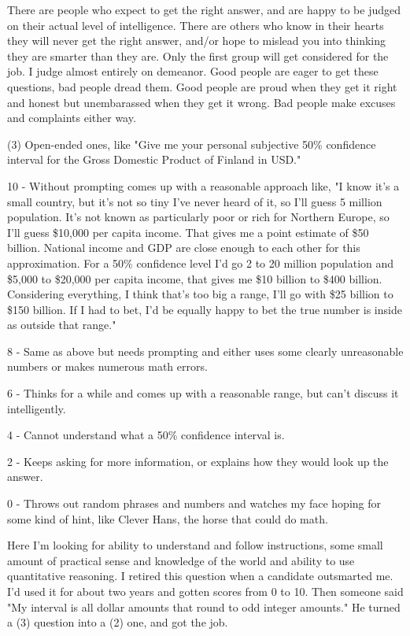 There are people who expect to get the right answer, and are happy to be judged on their actual level of intelligence. There are others who know in their hearts they will never get the right answer, and/or hope to mislead you into thinking they are smarter than they are. Only the first group will get considered for the job. I judge almost entirely on demeanor. Good people are eager to get these questions, bad people dread them. Good people are proud when they get it right and honest but unembarassed when they get it wrong. Bad people make excuses and complaints either way.\par

(3) Open-ended ones, like "Give me your personal subjective 50\% confidence interval for the Gross Domestic Product of Finland in USD."\par

10 - Without prompting comes up with a reasonable approach like, "I know it's a small country, but it's not so tiny I've never heard of it, so I'll guess 5 million population. It's not known as particularly poor or rich for Northern Europe, so I'll guess \$10,000 per capita income. That gives me a point estimate of \$50 billion. National income and GDP are close enough to each other for this approximation. For a 50\% confidence level I'd go 2 to 20 million population and \$5,000 to \$20,000 per capita income, that gives me \$10 billion to \$400 billion. Considering everything, I think that's too big a range, I'll go with \$25 billion to \$150 billion. If I had to bet, I'd be equally happy to bet the true number is inside as outside that range."\par
8 - Same as above but needs prompting and either uses some clearly unreasonable numbers or makes numerous math errors.\par
6 - Thinks for a while and comes up with a reasonable range, but can't discuss it intelligently.\par
4 - Cannot understand what a 50\% confidence interval is.\par
2 - Keeps asking for more information, or explains how they would look up the answer.\par
0 - Throws out random phrases and numbers and watches my face hoping for some kind of hint, like Clever Hans, the horse that could do math.\par

Here I'm looking for ability to understand and follow instructions, some small amount of practical sense and knowledge of the world and ability to use quantitative reasoning. I retired this question when a candidate outsmarted me. I'd used it for about two years and gotten scores from 0 to 10. Then someone said "My interval is all dollar amounts that round to odd integer amounts." He turned a (3) question into a (2) one, and got the job.\par





